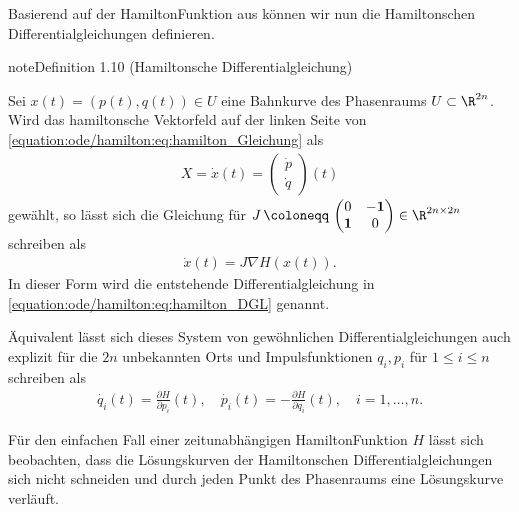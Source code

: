 \documentclass[letterpaper,10pt,english]{jupyterBook}
\begin{document}
\sphinxAtStartPar
Basierend auf der Hamilton\sphinxhyphen{}Funktion aus {\hyperref[\detokenize{ode/hamilton:def:hamiltonsch}]{}} können wir nun die Hamiltonschen Differentialgleichungen definieren.
\label{ode/hamilton:definition-2}
\begin{sphinxadmonition}{note}{Definition 1.10 (Hamiltonsche Differentialgleichung)}



\sphinxAtStartPar
Sei \(x(t) = (p(t),q(t)) \in U\) eine Bahnkurve des Phasenraums \(U \subset \R^{2n}\).
Wird das hamiltonsche Vektorfeld auf der linken Seite von \eqref{equation:ode/hamilton:eq:hamilton_Gleichung} als
\begin{equation*}
\begin{split}X = \dot{x}(t) = \begin{pmatrix} \dot{p} \\ \dot{q} \end{pmatrix} (t)\end{split}
\end{equation*}
\sphinxAtStartPar
gewählt, so lässt sich die Gleichung für \(J \, \coloneqq \, \begin{pmatrix}0 & -\mathbf{1}\\ \mathbf{1} & 0 \end{pmatrix} \in \R^{2n \times 2n}\) schreiben als
\begin{equation}\label{equation:ode/hamilton:eq:hamilton_DGL}
\begin{split}\dot{x}(t) = J \nabla H(x(t)).\end{split}
\end{equation}
\sphinxAtStartPar
In dieser Form wird die entstehende Differentialgleichung in \eqref{equation:ode/hamilton:eq:hamilton_DGL}  genannt.

\sphinxAtStartPar
Äquivalent lässt sich dieses System von gewöhnlichen Differentialgleichungen auch explizit für die \(2n\) unbekannten Orts\sphinxhyphen{} und Impulsfunktionen \(q_i, p_i\) für \(1 \leq i \leq n\) schreiben als
\begin{equation*}
\begin{split}\dot{q_i}(t) = \frac{\partial H}{\partial p_i}(t), \quad \dot{p_i}(t) = -\frac{\partial H}{\partial q_i}(t), \quad i=1,\ldots,n.\end{split}
\end{equation*}\end{sphinxadmonition}

\sphinxAtStartPar
Für den einfachen Fall einer zeitunabhängigen Hamilton\sphinxhyphen{}Funktion \(H\) lässt sich beobachten, dass die Lösungskurven der Hamiltonschen Differentialgleichungen sich nicht schneiden und durch jeden Punkt des Phasenraums eine Lösungskurve verläuft.
\end{document}
